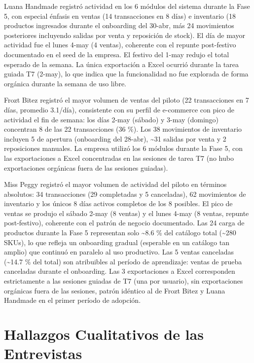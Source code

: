 Luana Handmade registró actividad en los 6 módulos del sistema durante la Fase 5, con especial énfasis en ventas (14 transacciones en 8 días) e inventario (18 productos ingresados durante el onboarding del 30-abr, más 24 movimientos posteriores incluyendo salidas por venta y reposición de stock). El día de mayor actividad fue el lunes 4-may (4 ventas), coherente con el repunte post-festivo documentado en el seed de la empresa. El festivo del 1-may redujo el total esperado de la semana. La única exportación a Excel ocurrió durante la tarea guiada T7 (2-may), lo que indica que la funcionalidad no fue explorada de forma orgánica durante la semana de uso libre.

Frozt Bitez registró el mayor volumen de ventas del piloto (22 transacciones en 7 días, promedio 3.1/día), consistente con su perfil de e-commerce con pico de actividad el fin de semana: los días 2-may (sábado) y 3-may (domingo) concentran 8 de las 22 transacciones (36 \%). Los 38 movimientos de inventario incluyen 5 de apertura (onboarding del 28-abr), \textasciitilde31 salidas por venta y 2 reposiciones manuales. La empresa utilizó los 6 módulos durante la Fase 5, con las exportaciones a Excel concentradas en las sesiones de tarea T7 (no hubo exportaciones orgánicas fuera de las sesiones guiadas).

Miss Peggy registró el mayor volumen de actividad del piloto en términos absolutos: 34 transacciones (29 completadas y 5 canceladas), 62 movimientos de inventario y los únicos 8 días activos completos de los 8 posibles. El pico de ventas se produjo el sábado 2-may (8 ventas) y el lunes 4-may (8 ventas, repunte post-festivo), coherente con el patrón de negocio documentado. Las 24 carga de productos durante la Fase 5 representan solo \textasciitilde8.6 \% del catálogo total (\textasciitilde280 SKUs), lo que refleja un onboarding gradual (esperable en un catálogo tan amplio) que continuó en paralelo al uso productivo. Las 5 ventas canceladas (\textasciitilde14.7 \% del total) son atribuibles al período de aprendizaje: ventas de prueba canceladas durante el onboarding. Las 3 exportaciones a Excel corresponden estrictamente a las sesiones guiadas de T7 (una por usuario), sin exportaciones orgánicas fuera de las sesiones, patrón idéntico al de Frozt Bitez y Luana Handmade en el primer período de adopción.

\section{Hallazgos Cualitativos de las Entrevistas}\label{hallazgos-cualitativos-de-las-entrevistas}

